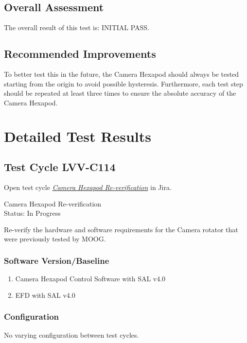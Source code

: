 \documentclass[SE,lsstdraft,STR,toc]{lsstdoc}
\providecommand{\tightlist}{
  \setlength{\itemsep}{0pt}\setlength{\parskip}{0pt}}
\begin{document}
\subsection{Overall Assessment}
\label{sect:overallassessment}

The overall result of this test is: INITIAL PASS.\\[2\baselineskip]

\subsection{Recommended Improvements}
\label{sect:recommendations}

To better test this in the future, the Camera Hexapod should always be
tested starting from the origin to avoid possible hysteresis.
Furthermore, each test step should be repeated at least three times to
ensure the absolute accuracy of the Camera Hexapod.~

\newpage
\section{Detailed Test Results}
\label{sect:detailedtestresults}

\subsection{Test Cycle LVV-C114 }

Open test cycle {\it \href{https://jira.lsstcorp.org/secure/Tests.jspa#/testrun/LVV-C114}{Camera Hexapod Re-verification}} in Jira.

Camera Hexapod Re-verification\\
Status: In Progress

Re-verify the hardware and software requirements for the Camera rotator
that were previously tested by MOOG.

\subsubsection{Software Version/Baseline}
\begin{enumerate}
\tightlist
\item
  Camera Hexapod Control Software with SAL v4.0
\item
  EFD with SAL v4.0
\end{enumerate}

\subsubsection{Configuration}
No varying configuration between test cycles.
\end{document}
